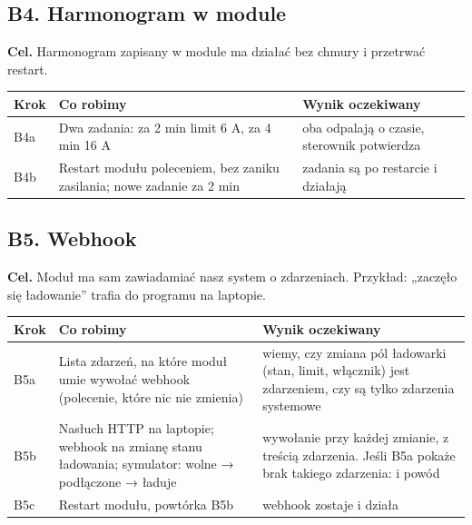 \documentclass[11pt,a4paper]{article}
\begin{document}
\subsection{B4. Harmonogram w module}

\textbf{Cel.} Harmonogram zapisany w module ma działać bez chmury i przetrwać restart.


\begin{longtable}{>{\raggedright\arraybackslash}p{3.00cm}>{\raggedright\arraybackslash}p{7.04cm}>{\raggedright\arraybackslash}p{5.24cm}}
\toprule
\rowcolor{apteallight}\textbf{Krok} & \textbf{Co robimy} & \textbf{Wynik oczekiwany} \\
\midrule\endhead
\bottomrule\endfoot
B4a & Dwa zadania: za 2 min limit 6 A, za 4 min 16 A & oba odpalają o czasie, sterownik potwierdza \\
B4b & Restart modułu poleceniem, bez zaniku zasilania; nowe zadanie za 2 min & zadania są po restarcie i działają \\
\end{longtable}

\subsection{B5. Webhook}

\textbf{Cel.} Moduł ma sam zawiadamiać nasz system o zdarzeniach. Przykład: „zaczęło się ładowanie” trafia do programu na laptopie.


\begin{longtable}{>{\raggedright\arraybackslash}p{3.00cm}>{\raggedright\arraybackslash}p{5.89cm}>{\raggedright\arraybackslash}p{6.39cm}}
\toprule
\rowcolor{apteallight}\textbf{Krok} & \textbf{Co robimy} & \textbf{Wynik oczekiwany} \\
\midrule\endhead
\bottomrule\endfoot
B5a & Lista zdarzeń, na które moduł umie wywołać webhook (polecenie, które nic nie zmienia) & wiemy, czy zmiana pól ładowarki (stan, limit, włącznik) jest zdarzeniem, czy są tylko zdarzenia systemowe \\
B5b & Nasłuch HTTP na laptopie; webhook na zmianę stanu ładowania; symulator: wolne {\symbolfont→} podłączone {\symbolfont→} ładuje & wywołanie przy każdej zmianie, z treścią zdarzenia. Jeśli B5a pokaże brak takiego zdarzenia: \leavevmode{\symbolfont\color{apred}\textbf{✘}} i powód \\
B5c & Restart modułu, powtórka B5b & webhook zostaje i działa \\
\end{longtable}
\end{document}
